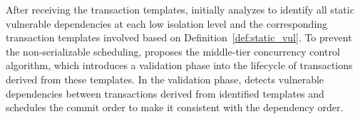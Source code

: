 
After receiving the transaction templates, \sysname initially analyzes to identify all static vulnerable dependencies at each low isolation level and the corresponding transaction templates involved based on Definition~\ref{def:static_vul}. 
To prevent the non-serializable scheduling, \sysname proposes the middle-tier concurrency control algorithm, which introduces a validation phase into the lifecycle of transactions derived from these templates. 
In the validation phase, \sysname detects vulnerable dependencies between transactions derived from identified templates and schedules the commit order to make it consistent with the dependency order. 





